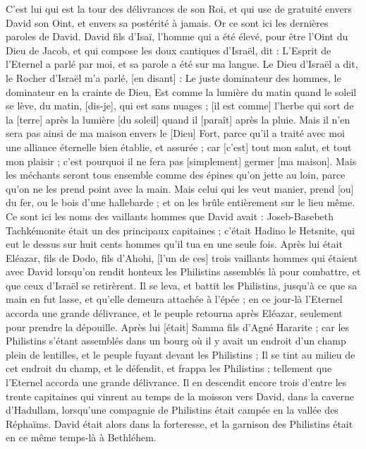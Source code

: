 \begin{multicols}{2}
C'est lui qui est la tour des délivrances de son Roi, et qui use de gratuité envers David son Oint, et envers sa postérité à jamais.
\VerseOne{}Or ce sont ici les dernières paroles de David. David fils d'Isaï, l'homme qui a été élevé, pour être l'Oint du Dieu de Jacob, et qui compose les doux cantiques d'Israël, dit :
L'Esprit de l'Eternel a parlé par moi, et sa parole a été sur ma langue.
Le Dieu d'Israël a dit, le Rocher d'Israël m'a parlé, [en disant] : Le juste dominateur des hommes, le dominateur en la crainte de Dieu,
Est comme la lumière du matin quand le soleil se lève, du matin, [dis-je], qui est sans nuages ; [il est comme] l'herbe qui sort de la [terre] après la lumière [du soleil] quand il [paraît] après la pluie.
Mais il n'en sera pas ainsi de ma maison envers le [Dieu] Fort, parce qu'il a traité avec moi une alliance éternelle bien établie, et assurée ; car [c'est] tout mon salut, et tout mon plaisir ; c'est pourquoi il ne fera pas [simplement] germer [ma maison].
Mais les méchants seront tous ensemble comme des épines qu'on jette au loin, parce qu'on ne les prend point avec la main.
Mais celui qui les veut manier, prend [ou] du fer, ou le bois d'une hallebarde ; et on les brûle entièrement sur le lieu même.
Ce sont ici les noms des vaillants hommes que David avait : Joseb-Basebeth Tachkémonite était un des principaux capitaines ; c'était Hadino le Hetsnite, qui eut le dessus sur huit cents hommes qu'il tua en une seule fois.
Après lui était Eléazar, fils de Dodo, fils d'Ahohi, [l'un de ces] trois vaillants hommes qui étaient avec David lorsqu'on rendit honteux les Philistins assemblés là pour combattre, et que ceux d'Israël se retirèrent.
Il se leva, et battit les Philistins, jusqu'à ce que sa main en fut lasse, et qu'elle demeura attachée à l'épée ; en ce jour-là l'Eternel accorda une grande délivrance, et le peuple retourna après Eléazar, seulement pour prendre la dépouille.
Après lui [était] Samma fils d'Agné Hararite ; car les Philistins s'étant assemblés dans un bourg où il y avait un endroit d'un champ plein de lentilles, et le peuple fuyant devant les Philistins ;
Il se tint au milieu de cet endroit du champ, et le défendit, et frappa les Philistins ; tellement que l'Eternel accorda une grande délivrance.
Il en descendit encore trois d'entre les trente capitaines qui vinrent au temps de la moisson vers David, dans la caverne d'Hadullam, lorsqu'une compagnie de Philistins était campée en la vallée des Réphaïms.
David était alors dans la forteresse, et la garnison des Philistins était en ce même temps-là à Bethléhem.

\end{multicols}
